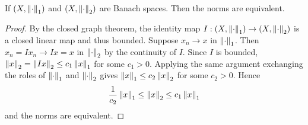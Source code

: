 \begin{proposition}
    If $(X,\left\lVert {\cdot} \right\rVert_1)$ and $(X,\left\lVert {\cdot} \right\rVert_2)$ are Banach spaces. Then 
    the norms are equivalent.
\end{proposition}
\begin{proof}
    By the closed graph theorem, the identity map $I:(X,\left\lVert {\cdot} \right\rVert_1)\to(X,\left\lVert {\cdot} \right\rVert_2)$ 
    is a closed linear map and thus bounded. Suppose $x_n\to x$ in $\left\lVert {\cdot} \right\rVert_1$. 
    Then $x_n = Ix_n\to Ix = x$ in $\left\lVert {\cdot} \right\rVert_2$ by the continuity of $I$. Since 
    $I$ is bounded, $\left\lVert {x} \right\rVert_2 = \left\lVert {Ix} \right\rVert_2 \leq c_1\left\lVert {x} \right\rVert_1$ for some $c_1>0$. 
    Applying the same argument exchanging the roles of $\left\lVert {\cdot} \right\rVert_1$ and $\left\lVert {\cdot} \right\rVert_2$ 
    gives $\left\lVert {x} \right\rVert_1 \leq c_2\left\lVert {x} \right\rVert_2$ for some $c_2>0$. Hence 
    \begin{equation*}
        \frac{1}{c_2}\left\lVert {x} \right\rVert_1 \leq \left\lVert {x} \right\rVert_2 \leq c_1\left\lVert {x} \right\rVert_1
    \end{equation*}
    and the norms are equivalent.
\end{proof}
